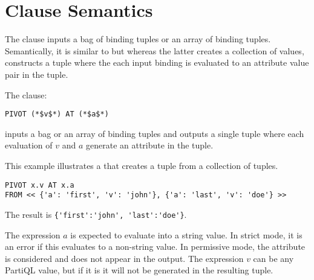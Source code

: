\section{\pivot Clause Semantics}
\label{sec:pivot}
The \pivot clause inputs a bag of binding tuples or an array of binding tuples.
Semantically, it is similar to \select {} but whereas the latter creates a
collection of values, \pivot constructs a tuple where the each input binding is
evaluated to an attribute value pair in the tuple.

The clause:

\begin{lstlisting}
PIVOT (*$v$*) AT (*$a$*)
\end{lstlisting}

\noindent inputs a bag or an array of binding tuples and outputs a single tuple
where each evaluation of $v$ and $a$ generate an attribute in the tuple.

\begin{example}
This example illustrates a \pivot that creates a tuple from a collection
of tuples.

\begin{lstlisting}
PIVOT x.v AT x.a
FROM << {'a': 'first', 'v': 'john'}, {'a': 'last', 'v': 'doe'} >>
\end{lstlisting}

\noindent The result is \lstinline|{'first':'john', 'last':'doe'}|.
\end{example}

The expression $a$ is expected to evaluate into a string value.  In strict mode,
it is an error if this evaluates to a non-string value.  In permissive mode, the
attribute is considered \MISSING and does not appear in the output.  The
expression $v$ can be any PartiQL value, but if it is \MISSING it will not be
generated in the resulting tuple.